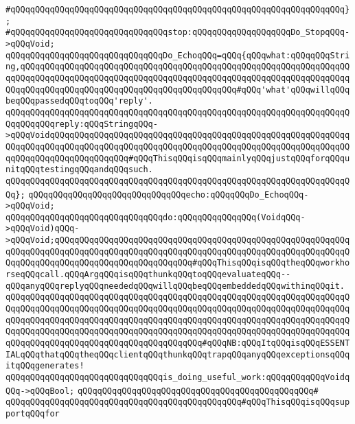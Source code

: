 \verb|#qQQqqQQqqQQqqQQqqQQqqQQqqQQqqQQqqQQqqQQqqQQqqQQqqQQqqQQqqQQqqQQqqQQq};|\newline
\verb|#qQQqqQQqqQQqqQQqqQQqqQQqqQQqqQQqstop:qQQqqQQqqQQqqQQqqQQqDo_StopqQQq->qQQqVoid;|\newline
\newline
\verb|qQQqqQQqqQQqqQQqqQQqqQQqqQQqqQQqDo_EchoqQQq=qQQq{qQQqwhat:qQQqqQQqString,qQQqqQQqqQQqqQQqqQQqqQQqqQQqqQQqqQQqqQQqqQQqqQQqqQQqqQQqqQQqqQQqqQQqqQQqqQQqqQQqqQQqqQQqqQQqqQQqqQQqqQQqqQQqqQQqqQQqqQQqqQQqqQQqqQQqqQQqqQQqqQQqqQQqqQQqqQQqqQQqqQQqqQQqqQQqqQQqqQQqqQQq#qQQq'what'qQQqwillqQQqbeqQQqpassedqQQqtoqQQq'reply'.|\newline
\verb|qQQqqQQqqQQqqQQqqQQqqQQqqQQqqQQqqQQqqQQqqQQqqQQqqQQqqQQqqQQqqQQqqQQqqQQqqQQqqQQqreply:qQQqStringqQQq->qQQqVoidqQQqqQQqqQQqqQQqqQQqqQQqqQQqqQQqqQQqqQQqqQQqqQQqqQQqqQQqqQQqqQQqqQQqqQQqqQQqqQQqqQQqqQQqqQQqqQQqqQQqqQQqqQQqqQQqqQQqqQQqqQQqqQQqqQQqqQQqqQQqqQQqqQQqqQQqqQQq#qQQqThisqQQqisqQQqmainlyqQQqjustqQQqforqQQqunitqQQqtestingqQQqandqQQqsuch.|\newline
\verb|qQQqqQQqqQQqqQQqqQQqqQQqqQQqqQQqqQQqqQQqqQQqqQQqqQQqqQQqqQQqqQQqqQQqqQQq};|\newline
\verb|qQQqqQQqqQQqqQQqqQQqqQQqqQQqqQQqecho:qQQqqQQqDo_EchoqQQq->qQQqVoid;|\newline
\newline
\verb|qQQqqQQqqQQqqQQqqQQqqQQqqQQqqQQqdo:qQQqqQQqqQQqqQQq(VoidqQQq->qQQqVoid)qQQq->qQQqVoid;qQQqqQQqqQQqqQQqqQQqqQQqqQQqqQQqqQQqqQQqqQQqqQQqqQQqqQQqqQQqqQQqqQQqqQQqqQQqqQQqqQQqqQQqqQQqqQQqqQQqqQQqqQQqqQQqqQQqqQQqqQQqqQQqqQQqqQQqqQQqqQQqqQQqqQQqqQQqqQQqqQQqqQQq#qQQqThisqQQqisqQQqtheqQQqworkhorseqQQqcall.qQQqArgqQQqisqQQqthunkqQQqtoqQQqevaluateqQQq--qQQqanyqQQqreplyqQQqneededqQQqwillqQQqbeqQQqembeddedqQQqwithinqQQqit.|\newline
\verb|qQQqqQQqqQQqqQQqqQQqqQQqqQQqqQQqqQQqqQQqqQQqqQQqqQQqqQQqqQQqqQQqqQQqqQQqqQQqqQQqqQQqqQQqqQQqqQQqqQQqqQQqqQQqqQQqqQQqqQQqqQQqqQQqqQQqqQQqqQQqqQQqqQQqqQQqqQQqqQQqqQQqqQQqqQQqqQQqqQQqqQQqqQQqqQQqqQQqqQQqqQQqqQQqqQQqqQQqqQQqqQQqqQQqqQQqqQQqqQQqqQQqqQQqqQQqqQQqqQQqqQQqqQQqqQQqqQQqqQQqqQQqqQQqqQQqqQQqqQQqqQQqqQQqqQQqqQQqqQQq#qQQqNB:qQQqItqQQqisqQQqESSENTIALqQQqthatqQQqtheqQQqclientqQQqthunkqQQqtrapqQQqanyqQQqexceptionsqQQqitqQQqgenerates!|\newline
\verb|qQQqqQQqqQQqqQQqqQQqqQQqqQQqqQQqis_doing_useful_work:qQQqqQQqqQQqVoidqQQq->qQQqBool;|\newline
\verb|qQQqqQQqqQQqqQQqqQQqqQQqqQQqqQQqqQQqqQQqqQQqqQQq#|\newline
\verb|qQQqqQQqqQQqqQQqqQQqqQQqqQQqqQQqqQQqqQQqqQQqqQQq#qQQqThisqQQqisqQQqsupportqQQqfor|\newline
